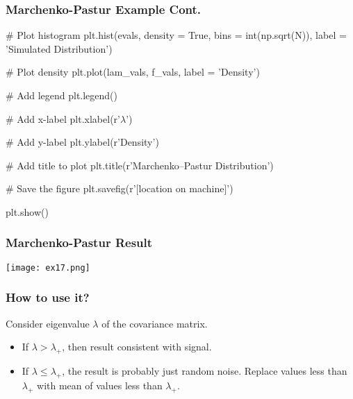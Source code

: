 \documentclass{beamer}
\begin{document}
\begin{frame}[fragile]
\frametitle{Marchenko-Pastur Example Cont.}

{
\linespread{0.8}
\tiny
\begin{verbatim*}
# Plot histogram
plt.hist(evals, density = True, bins = int(np.sqrt(N)), label = 'Simulated Distribution')

# Plot density
plt.plot(lam_vals, f_vals, label = 'Density')

# Add legend
plt.legend()

# Add x-label
plt.xlabel(r'$\lambda$')

# Add y-label
plt.ylabel(r'Density')

# Add title to plot
plt.title(r'Marchenko–Pastur Distribution')

# Save the figure
plt.savefig(r'[location on machine]')

plt.show()
\end{verbatim*}
}

\end{frame}

\begin{frame}[fragile]
\frametitle{Marchenko-Pastur Result}

\begin{center}
\texttt{[image: ex17.png]}
\end{center}

\end{frame}

\begin{frame}
\frametitle{How to use it?}
Consider eigenvalue $\lambda$ of the covariance matrix.
\begin{itemize}
\item If $\lambda > \lambda_+$, then result consistent with signal. 
\item If $\lambda \leq \lambda_+$, the result is probably just random noise. Replace values less than $\lambda_+$ with mean of values less than $\lambda_+$.
\end{itemize}

\end{frame}
\end{document}
